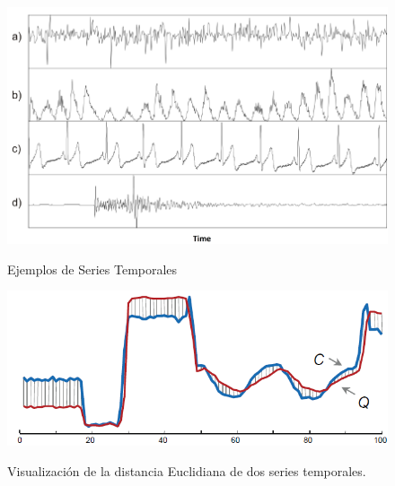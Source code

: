 \begin{figure}[h]
\vspace{0.1in}
\begin{center}
\includegraphics[scale=0.6]{timeSeries.png}\\%
\end{center}
\caption{Ejemplos de Series Temporales}
\label{arm:fig1}
\end{figure}
\begin{figure}[h]
\vspace{0.1in}
\begin{center}
\includegraphics[scale=0.6]{euclidean.png}\\
\end{center}
\caption{Visualizaci\'on de la distancia Euclidiana de dos series temporales.}
\label{arm:fig2}
\end{figure}
